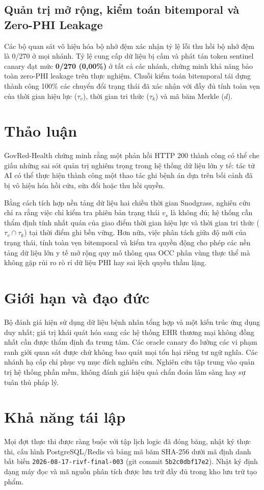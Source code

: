 \documentclass[11pt]{article}
\begin{document}
\subsection{Quản trị mở rộng, kiểm toán bitemporal và Zero-PHI Leakage}
Các bộ quan sát vô hiệu hóa bộ nhớ đệm xác nhận tỷ lệ lỗi thu hồi bộ nhớ đệm là 0/270 ở mọi nhánh. Tỷ lệ cung cấp dữ liệu bị cấm và phát tán token sentinel canary đạt mức \textbf{0/270 (0,00\%)} ở tất cả các nhánh, chứng minh khả năng bảo toàn zero-PHI leakage trên thực nghiệm. Chuỗi kiểm toán bitemporal tái dựng thành công 100\% các chuyển đổi trạng thái đã xác nhận với đầy đủ tính toàn vẹn của thời gian hiệu lực ($\tau_v$), thời gian tri thức ($\tau_k$) và mã băm Merkle ($d$).

\section{Thảo luận}
GovRed-Health chứng minh rằng một phản hồi HTTP 200 thành công có thể che giấu những sai sót quản trị nghiêm trọng trong hệ thống dữ liệu lớn y tế: tác tử AI có thể thực hiện thành công một thao tác ghi bệnh án dựa trên bối cảnh đã bị vô hiệu hóa hồi cứu, sửa đổi hoặc thu hồi quyền.

Bằng cách tích hợp nền tảng dữ liệu hai chiều thời gian Snodgrass, nghiên cứu chỉ ra rằng việc chỉ kiểm tra phiên bản trạng thái $v_s$ là không đủ; hệ thống cần thẩm định tính nhất quán của giao điểm thời gian hiệu lực và thời gian tri thức ($\tau_v \cap \tau_k$) tại thời điểm ghi bền vững. Hơn nữa, việc phân tách giữa độ mới của trạng thái, tính toàn vẹn bitemporal và kiểm tra quyền động cho phép các nền tảng dữ liệu lớn y tế mở rộng quy mô thông qua OCC phân vùng thực thể mà không gặp rủi ro rò rỉ dữ liệu PHI hay sai lệch quyền thầm lặng.

\section{Giới hạn và đạo đức}
Bộ đánh giá hiện sử dụng dữ liệu bệnh nhân tổng hợp và một kiến trúc ứng dụng duy nhất; giá trị khái quát hóa sang các hệ thống EHR thương mại không đồng nhất cần được thẩm định đa trung tâm. Các oracle canary đo lường các vi phạm ranh giới quan sát được chứ không bao quát mọi tổn hại riêng tư ngữ nghĩa. Các nhánh hạ cấp chỉ phục vụ mục đích nghiên cứu. Nghiên cứu tập trung vào quản trị hệ thống phần mềm, không đánh giá hiệu quả chẩn đoán lâm sàng hay sự tuân thủ pháp lý.

\section{Khả năng tái lập}
Mọi đợt thực thi được ràng buộc với tập lịch logic đã đóng băng, nhật ký thực thi, cấu hình PostgreSQL/Redis và bảng mã băm SHA-256 dưới mã định danh bất biến \texttt{2026-08-17-rivf-final-003} (git commit \texttt{5b2c0dbf17e2}). Nhật ký định dạng máy đọc và mã nguồn phân tích được lưu trữ đầy đủ trong kho lưu trữ tạo phẩm.
\end{document}
